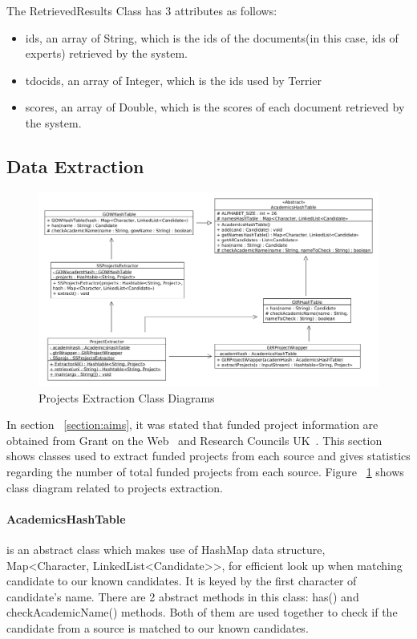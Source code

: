 The RetrievedResults Class has 3 attributes as follows:
\begin{itemize}
 \item ids, an array of String, which is the ids of the documents(in this case, ids of experts) retrieved by the system.
 \item tdocids, an array of Integer, which is the ids used by Terrier
 \item scores, an array of Double, which is the scores of each document retrieved by the system.
\end{itemize}

\subsection{Data Extraction}
\begin{figure}
\centering
\includegraphics[scale=0.35]{./figures/projectsExtraction.png}
\caption{Projects Extraction Class Diagrams} \label{fig:projectsExtraction} 
\end{figure}
In section ~\ref{section:aims}, it was stated that funded project information are obtained from Grant on the Web~\cite{gow} and Research Councils UK~\cite{gtr}.
This section shows classes used to extract funded projects from each source and gives statistics regarding the number of total funded projects from each source.
Figure ~\ref{fig:projectsExtraction} shows class diagram related to projects extraction.
\paragraph{AcademicsHashTable} is an abstract class which makes use of HashMap data structure, Map<Character, LinkedList<Candidate>>, for efficient look up when matching candidate to our
known candidates. It is keyed by the first character of candidate's name. There are 2 abstract methods in this class: has() and checkAcademicName() methods.
Both of them are used together to check if the candidate from a source is matched to our known candidates.
